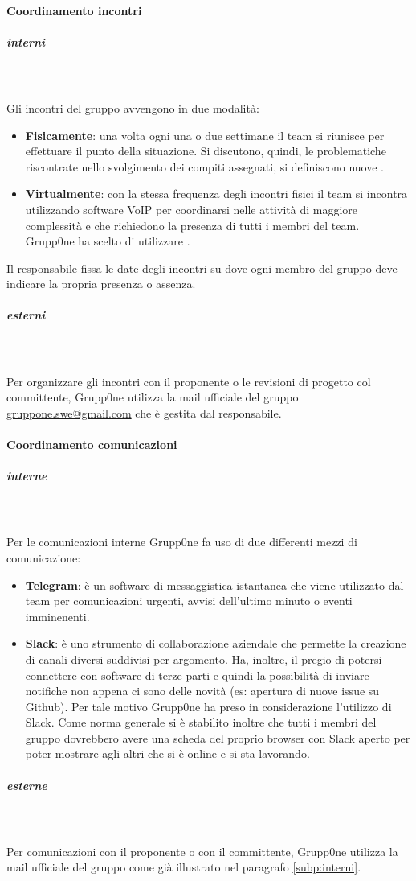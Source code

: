 \documentclass[../norme-di-progetto.tex]{subfiles}
\begin{document}
\paragraph{Coordinamento incontri}
\label{par:coordinamento incontri}
\subparagraph{interni}\mbox{}\\
\label{subp:interni}
\\Gli incontri del gruppo avvengono in due modalità:
\begin{itemize}
	\item \textbf{Fisicamente}: una volta ogni una o due settimane il team si riunisce per effettuare il punto della situazione. Si discutono, quindi, le problematiche riscontrate nello svolgimento dei compiti assegnati, si definiscono nuove .
	\item \textbf{Virtualmente}: con la stessa frequenza degli incontri fisici il team si incontra utilizzando software VoIP per coordinarsi nelle attività di maggiore complessità e che richiedono la presenza di tutti i membri del team. Grupp0ne ha scelto di utilizzare .
\end{itemize}
Il responsabile fissa le date degli incontri su  dove ogni membro del gruppo deve indicare la propria presenza o assenza.
\subparagraph{esterni}\mbox{}\\
\label{subp:esterni}
 \\Per organizzare gli incontri con il proponente o le revisioni di progetto col committente, Grupp0ne utilizza la mail ufficiale del gruppo \url{gruppone.swe@gmail.com} che è gestita dal responsabile.
\paragraph{Coordinamento comunicazioni}
\label{par:coordinamento comunicazioni}
\subparagraph{interne}\mbox{}\\
\label{subp:interne}
\\Per le comunicazioni interne Grupp0ne fa uso di due differenti mezzi di comunicazione:
\begin{itemize}
	\item \textbf{Telegram}: è un software di messaggistica istantanea che viene utilizzato dal team per comunicazioni urgenti, avvisi dell'ultimo minuto o eventi imminenenti.
	\item \textbf{Slack}: è uno strumento di collaborazione aziendale che permette la creazione di canali diversi suddivisi per argomento. Ha, inoltre, il pregio di potersi connettere con software di terze parti e quindi la possibilità di inviare notifiche non appena ci sono delle novità (es: apertura di nuove issue su Github). Per tale motivo Grupp0ne ha preso in considerazione l'utilizzo di Slack. Come norma generale si è stabilito inoltre che tutti i membri del gruppo dovrebbero avere una scheda del proprio browser con Slack aperto per poter mostrare agli altri che si è online e si sta lavorando.
\end{itemize}
\subparagraph{esterne}\mbox{}\\
\label{subp:interne}
\\Per comunicazioni con il proponente o con il committente, Grupp0ne utilizza la mail ufficiale del gruppo come già illustrato nel paragrafo \ref{subp:interni}.
\end{document}
